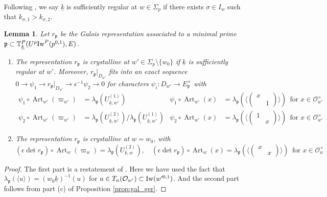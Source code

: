 \documentclass[leqno]{amsart}
\newtheorem{lem}[thm]{Lemma}
\theoremstyle{definition}
\theoremstyle{remark}
\newcommand{\oo}{\mathcal{O}}
\DeclareMathOperator{\Art}{Art}
\newcommand{\fp}{\mathfrak{p}}
\newcommand{\wt}[1]{\underline{ #1 }}
\newcommand{\Iw}{\textnormal{Iw}} %
\newcommand{\TT}{\mathbb{T}} %
\begin{document}
Following \cite{ger},
we say $\wt{k}$ is sufficiently regular
at $w\in \Sigma_p$
if there exists  $\sigma\in I_{w}$
such that  $k_{\sigma,1}>k_{\sigma,2}$.
\begin{lem}\label{lem:galois_at_p}
	Let $r_{\fp}$ be the Galois representation
	associated to a minimal prime
	$\fp\subset \TT^P_{\wt{k}}(U^p\Iw^P(p^{0,1}),E)$.
	\begin{enumerate}[label=(\alph*)]
	\item The representation $r_\fp$ is crystalline at
    $w'\in \Sigma_p\setminus\{ w_0\}$
	if $\wt{k}$ is sufficiently regular at $w'$.
	Moreover, $r_\fp\vert_{D_{w'}}$ 
	fits into an exact sequence
	$0\to \psi_1\to r_{\fp}\vert_{D_{w'}} \to \epsilon^{-1}\psi_2\to 0$
	for characters $\psi_i\colon D_{w'}\to E_{\fp}^{\times}$ with
	\begin{equation}\label{eq:Gal_hecke_at_p'}
	\begin{aligned}
		\psi_1\circ \Art_{w'}(\varpi_{w'})&=
		\lambda_{\fp}(U_{\wt{k},w'}^{(1)}) &
		\psi_1\circ \Art_{w'}(x)&=
		\lambda_{\fp}
		(\langle 
		(\begin{smallmatrix}
			x&\\&1
		\end{smallmatrix})
		\rangle)\, \text{ for }x\in \oo_{w'}^{\times}\\
		\psi_2\circ \Art_{w'}(\varpi_{w'})&=
		\lambda_{\fp}(U_{\wt{k},w'}^{(2)})/
		\lambda_{\fp}(U_{\wt{k},w'}^{(1)}) &
		\psi_2\circ \Art_{w'}(x)&=
		\lambda_{\fp}
		(\langle 
		(\begin{smallmatrix}
			1&\\&x
		\end{smallmatrix})
		\rangle)\, \text{ for }x\in \oo_{w'}^{\times}
	\end{aligned}
	\end{equation}
	\item The representation $r_\fp$ is 
	crystalline at $w=w_0$, with 
	\begin{equation}\label{eq:Gal_hecke_at_p}
	(\epsilon\det r_\fp)\circ \Art_w(\varpi_w)=
	\lambda_{\fp}(U_{\wt{k},w}^{(2)}),\quad
	(\epsilon\det r_\fp)\circ \Art_w(x)=
	\lambda_{\fp}
	(\langle 
	(\begin{smallmatrix}
		x&\\&x
	\end{smallmatrix})
	\rangle)\, \text{ for }x\in \oo_{w}^{\times}
	\end{equation}
	\end{enumerate}
\end{lem}
\begin{proof}
The first part is a restatement of \cite[Cor 2.33]{ger}.
Here we have used the fact that
$\lambda_\fp(\langle u\rangle)=(w_0\wt{k})^{-1}(u)$ 
for $u\in T_n(\oo_{w'})\subset \Iw(w'^{0,1})$. 
And the second part follows from part (c)
of Proposition \ref{prop:gal_ger}.
\end{proof}
\end{document}
